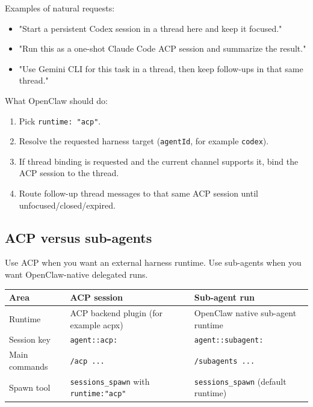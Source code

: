 Examples of natural requests:

\begin{itemize}
  \item "Start a persistent Codex session in a thread here and keep it focused."
  \item "Run this as a one-shot Claude Code ACP session and summarize the result."
  \item "Use Gemini CLI for this task in a thread, then keep follow-ups in that same thread."
\end{itemize}


What OpenClaw should do:

\begin{enumerate}
  \item Pick \texttt{runtime: "acp"}.
  \item Resolve the requested harness target (\texttt{agentId}, for example \texttt{codex}).
  \item If thread binding is requested and the current channel supports it, bind the ACP session to the thread.
  \item Route follow-up thread messages to that same ACP session until unfocused/closed/expired.
\end{enumerate}


\subsection{ACP versus sub-agents}


Use ACP when you want an external harness runtime. Use sub-agents when you want OpenClaw-native delegated runs.


\begin{table}[h]
\centering
\small
\begin{tabular}{|l|l|l|}
\hline
Area & ACP session & Sub-agent run \\
\hline
Runtime & ACP backend plugin (for example acpx) & OpenClaw native sub-agent runtime \\
\hline
Session key & \texttt{agent::acp:} & \texttt{agent::subagent:} \\
\hline
Main commands & \texttt{/acp ...} & \texttt{/subagents ...} \\
\hline
Spawn tool & \texttt{sessions\_spawn} with \texttt{runtime:"acp"} & \texttt{sessions\_spawn} (default runtime) \\
\hline
\end{tabular}
\end{table}



